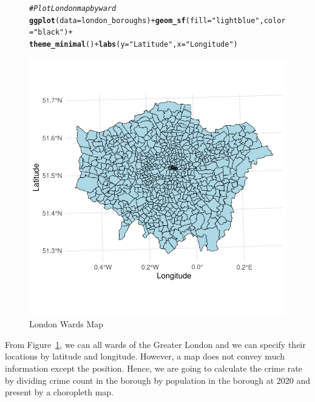 \documentclass{article}\usepackage[]{graphicx}\usepackage[]{xcolor}
\makeatletter
\def\maxwidth{ %
  \ifdim\Gin@nat@width>\linewidth
    \linewidth
  \else
    \Gin@nat@width
  \fi
}
\newcommand{\hlstr}[1]{\textcolor[rgb]{0.192,0.494,0.8}{#1}}%
\newcommand{\hlcom}[1]{\textcolor[rgb]{0.678,0.584,0.686}{\textit{#1}}}%
\newcommand{\hlopt}[1]{\textcolor[rgb]{0,0,0}{#1}}%
\newcommand{\hlstd}[1]{\textcolor[rgb]{0.345,0.345,0.345}{#1}}%
\newcommand{\hlkwc}[1]{\textcolor[rgb]{0.333,0.667,0.333}{#1}}%
\newcommand{\hlkwd}[1]{\textcolor[rgb]{0.737,0.353,0.396}{\textbf{#1}}}%
\newenvironment{kframe}{%
 \def\at@end@of@kframe{}%
 \ifinner\ifhmode%
  \def\at@end@of@kframe{\end{minipage}}%
  \begin{minipage}{\columnwidth}%
 \fi\fi%
 \def\FrameCommand##1{\hskip\@totalleftmargin \hskip-\fboxsep
 \colorbox{shadecolor}{##1}\hskip-\fboxsep
     \hskip-\linewidth \hskip-\@totalleftmargin \hskip\columnwidth}%
 \MakeFramed {\advance\hsize-\width
   \@totalleftmargin\z@ \linewidth\hsize
   \@setminipage}}%
 {\par\unskip\endMakeFramed%
 \at@end@of@kframe}
\newenvironment{knitrout}{}{} %
\makeatother
\begin{document}
\begin{figure}[H]
\begin{knitrout}\scriptsize
{}\color{fgcolor}\begin{kframe}
\begin{alltt}
\hlcom{# Plot London map by ward}
\hlkwd{ggplot}\hlstd{(}\hlkwc{data} \hlstd{= london_boroughs)} \hlopt{+} \hlkwd{geom_sf}\hlstd{(}\hlkwc{fill} \hlstd{=} \hlstr{"lightblue"}\hlstd{,} \hlkwc{color} \hlstd{=} \hlstr{"black"}\hlstd{)} \hlopt{+}
  \hlkwd{theme_minimal}\hlstd{()} \hlopt{+} \hlkwd{labs}\hlstd{(}\hlkwc{y}\hlstd{=}\hlstr{"Latitude"}\hlstd{,} \hlkwc{x}\hlstd{=}\hlstr{"Longitude"}\hlstd{)}
\end{alltt}
\end{kframe}

{\centering \includegraphics[width=\maxwidth]{figure/beamer-unnamed-chunk-6-1} 

}


\end{knitrout}
\centering
\caption{London Wards Map}
\label{fig:London Wards Map}
\end{figure}
\endgroup

From Figure~\ref{fig:London Wards Map}, we can all wards of the Greater London and we can specify their locations by latitude and longitude. However, a map does not convey much information except the position. Hence, we are going to calculate the crime rate by dividing crime count in the borough by population in the borough at 2020 and present by a choropleth map.
\end{document}
